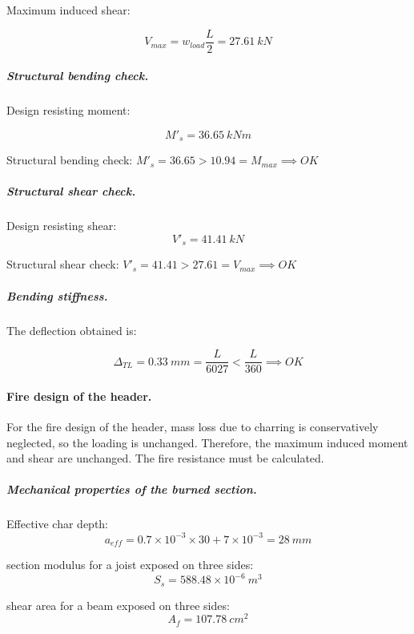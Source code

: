 \noindent Maximum induced shear:

\begin{equation}
  V_{max}= w_{load} \frac{L}{2}= 27.61\ kN
\end{equation}

\subparagraph{Structural bending check.}

\noindent Design resisting moment:

\begin{equation}
  M'_s= 36.65\ kN m
\end{equation}

\noindent Structural bending check: $M'_s = 36.65 > 10.94 = M_{max} \implies OK$

\subparagraph{Structural shear check.}

\noindent Design resisting shear:
\begin{equation}
  V'_s= 41.41\ kN
\end{equation}

\noindent Structural shear check: $V'_s = 41.41 > 27.61 = V_{max} \implies OK$

\subparagraph{Bending stiffness.}
The deflection obtained is:

\begin{equation}
  \Delta_{TL}= 0.33\ mm= \frac{L}{6027} < \frac{L}{360} \implies OK
\end{equation}

\paragraph{Fire design of the header.}
For the fire design of the header, mass loss due to charring is conservatively neglected, so the loading is unchanged. Therefore, the maximum induced moment and shear are unchanged. The fire resistance must be calculated.

\subparagraph{Mechanical properties of the burned section.}

\noindent Effective char depth:
\begin{equation}
  a_{eff}= 0.7 \times 10^{-3} \times 30 + 7 \times 10^{-3}= 28\ mm
\end{equation}

\noindent section modulus for a joist exposed on three sides:
\begin{equation}
  S_s= 588.48 \times 10^{-6}\ m^3
\end{equation}

\noindent shear area for a beam exposed on three sides:
\begin{equation}
  A_f= 107.78\ cm^2
\end{equation}

